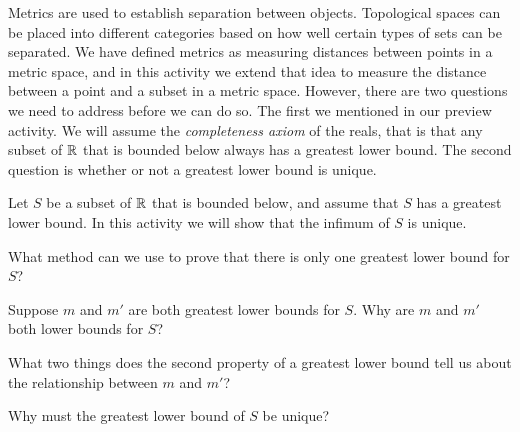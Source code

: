 \label{sec_dist_point_set}

Metrics are used to establish separation between objects. Topological spaces can be placed into different categories based on how well certain types of sets can be separated. We have defined metrics as measuring distances between points in a metric space, and in this activity we extend that idea to measure the distance between a point and a subset in a metric space. However, there are two questions we need to address before we can do so. The first we mentioned in our preview activity. We will assume the \emph{completeness axiom} of the reals, that is that any subset of $\mathbb{R}$ that is bounded below always has a greatest lower bound. The second question is whether or not a greatest lower bound is unique. 

\begin{activity} Let $S$ be a subset of $\mathbb{R}$ that is bounded below, and assume that $S$ has a greatest lower bound. In this activity we will show that the infimum of $S$ is unique. 
\ba
\item What method can we use to prove that there is only one greatest lower bound for $S$?

\item Suppose $m$ and $m'$ are both greatest lower bounds for $S$. Why are $m$ and $m'$ both lower bounds for $S$?

\item What two things does the second property of a greatest lower bound tell us about the relationship between $m$ and $m'$?  

\item Why must the greatest lower bound of $S$ be unique?

\ea

\end{activity}

\begin{comment}

\ActivitySolution

\ba
\item We assume that there are two greatest lower bounds for $S$ and show that they are equal. 

\item Suppose $m$ and $m'$ are both greatest lower bounds for $S$. By definition, every greatest lower bound is also a lower bound. 

\item Since $m$ is a lower bound for $S$ and $m'$ is a greatest lower bound for $S$, it follows that $m \leq m'$. Similarly, $m'$ is a lower bound for $S$ and $m$ is a greatest lower bound for $S$ so $m' \leq m$.  

\item The two inequalities $m \leq m'$ and $m' \leq m$ show that $m = m'$ and so there is only one greatest lower bound of $S$.

\ea


\end{comment}

